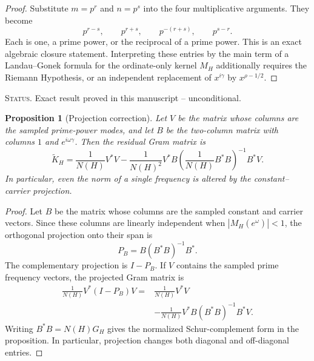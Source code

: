 \documentclass[11pt]{amsart}
\numberwithin{equation}{section}
\theoremstyle{plain}
\newtheorem{proposition}[theorem]{Proposition}
\theoremstyle{definition}
\theoremstyle{remark}
\newcommand{\1}{\mathbf{1}}
\newcommand{\statusnote}[1]{%
  \par\smallskip\noindent
  \begingroup\footnotesize\textsc{Status.} #1\endgroup
  \par\smallskip}
\begin{document}
\begin{proof}
Substitute \(m=p^r\) and \(n=p^s\) into the four multiplicative arguments.
They become
\begin{equation}
p^{r-s},
\qquad
p^{r+s},
\qquad
p^{-(r+s)},
\qquad
p^{s-r}.
\label{eq:same_tower_arguments_proof}
\end{equation}
Each is one, a prime power, or the reciprocal of a prime power.  This is
an exact algebraic closure statement.  Interpreting these entries by the
main term of a Landau--Gonek formula for the ordinate-only kernel
\(M_H\) additionally requires the Riemann Hypothesis, or an independent
replacement of \(x^{i\gamma}\) by \(x^{\rho-1/2}\).
\end{proof}

\statusnote{Exact result proved in this manuscript -- unconditional.}
\begin{proposition}[Projection correction]
\label{prop:projection_correction_detailed}
Let $V$ be the matrix whose columns are the sampled prime-power modes, and
let $B$ be the two-column matrix with columns $1$ and $e^{i\omega\gamma}$.
Then the residual Gram matrix is
\begin{equation}
\widetilde K_H
=
\frac1{N(H)}V^\ast V
-
\frac1{N(H)^2}
V^\ast B
\left(\frac1{N(H)}B^\ast B\right)^{-1}
B^\ast V.
\label{eq:matrix_schur_projection}
\end{equation}
In particular, even the norm of a single frequency is altered by the
constant--carrier projection.
\end{proposition}

\begin{proof}
Let \(B\) be the matrix whose columns are the sampled constant and carrier
vectors.  Since these columns are linearly independent when
\(|M_H(e^\omega)|<1\), the orthogonal projection onto their span is
\begin{equation}
P_B=B(B^\ast B)^{-1}B^\ast.
\label{eq:projection_PB_detailed}
\end{equation}
The complementary projection is \(I-P_B\).  If \(V\) contains the sampled
prime frequency vectors, the projected Gram matrix is
\begin{align}
\frac1{N(H)}V^\ast(I-P_B)V
={}&
\frac1{N(H)}V^\ast V
\label{eq:projection_gram_one}
\\
&-
\frac1{N(H)}V^\ast B(B^\ast B)^{-1}B^\ast V.
\label{eq:projection_gram_two}
\end{align}
Writing \(B^\ast B=N(H)G_H\) gives the normalized Schur-complement form in
the proposition.  In particular, projection changes both diagonal and
off-diagonal entries.
\end{proof}
\end{document}
